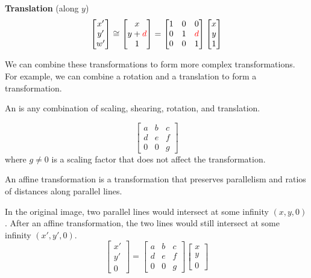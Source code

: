 \begin{listu}
    \textbf{Translation} (along $y$) \[
        \begin{bmatrix}
            x' \\ y' \\ w'
        \end{bmatrix} \cong \begin{bmatrix}
            x \\ y + {\color{red} d} \\ 1
        \end{bmatrix} = \begin{bmatrix}
            1 & 0 & 0 \\
            0 & 1 & {\color{red} d} \\
            0 & 0 & 1
        \end{bmatrix} \begin{bmatrix}
            x \\ y \\ 1
        \end{bmatrix}
    \]
\end{listu}

We can combine these transformations to form more complex transformations. For example, we can combine a rotation and a translation to form a  transformation. 

\begin{definition}
    An  is any combination of scaling, shearing, rotation, and translation.

    \[ 
        \begin{bmatrix}
            a & b & c \\
            d & e & f \\
            0 & 0 & g
        \end{bmatrix} 
    \] where $g \neq 0$ is a scaling factor that does not affect the transformation.
\end{definition}

\begin{remark}
    An affine transformation is a transformation that preserves parallelism and ratios of distances along parallel lines.
\end{remark}

In the original image, two parallel lines would intersect at some infinity $(x, y, 0)$. After an affine transformation, the two lines would still intersect at some infinity $(x', y', 0)$. \[
    \begin{bmatrix}
        x' \\ y' \\ 0
    \end{bmatrix} = \begin{bmatrix}
        a & b & c \\
        d & e & f \\
        0 & 0 & g
    \end{bmatrix} \begin{bmatrix}
        x \\ y \\ 0
    \end{bmatrix}
\]

